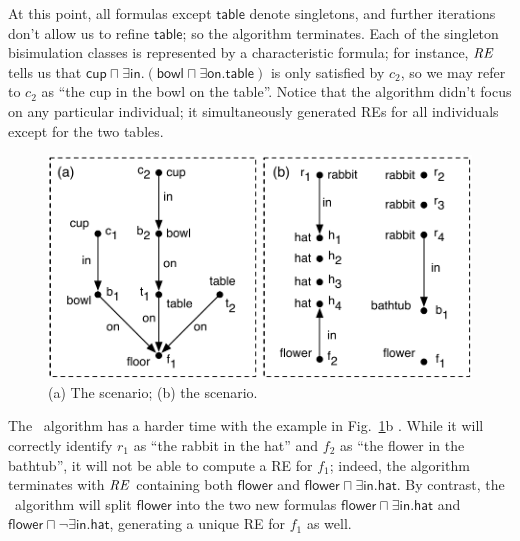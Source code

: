 At this point, all formulas except $\mathsf{table}$ denote singletons,
and further iterations don't allow us to refine $\mathsf{table}$; so
the algorithm terminates.  Each of the singleton bisimulation classes
is represented by a characteristic formula; for instance, $\mathit{RE}$ tells
us that $\mathsf{cup} \sqcap \exists \mathsf{in}. (\mathsf{bowl}
\sqcap \exists \mathsf{on}.\mathsf{table})$ is only satisfied by
$c_2$, so we may refer to $c_2$ as ``the cup in the bowl on the
table''.  Notice that the algorithm didn't focus on any particular
individual; it simultaneously generated REs for all individuals except
for the two tables.


\begin{figure}[t]
  \centering
  \includegraphics[width=\columnwidth]{pic-dale-haddock}
  \caption{(a) The 
    scenario; (b) the  scenario.}
  \label{fig:dale-haddock}
\end{figure}

The \el\ algorithm has a harder time with the example in
Fig.~\ref{fig:dale-haddock}b \cite{Stone1998a}.  While it will
correctly identify $r_1$ as ``the rabbit in the hat'' and $f_2$ as
``the flower in the bathtub'', it will not be able to compute a
RE for $f_1$; indeed, the algorithm terminates with $\mathit{RE}$ containing
both $\mathsf{flower}$ and $\mathsf{flower} \sqcap \exists
\mathsf{in}.\mathsf{hat}$.  By contrast, the \alc\ algorithm will
split $\mathsf{flower}$ into the two new formulas $\mathsf{flower}
\sqcap \exists \mathsf{in}.\mathsf{hat}$ and $\mathsf{flower} \sqcap
\neg \exists \mathsf{in}.\mathsf{hat}$, generating a unique RE for
$f_1$ as well.




